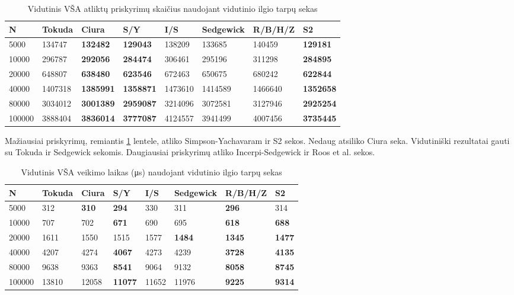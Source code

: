 \documentclass{VUMIFInfKursinis}
\begin{document}
\begin{table}[H]
  \caption{Vidutinis VŠA atliktų priskyrimų skaičius naudojant vidutinio ilgio tarpų sekas}
  \label{tss_medium_assignments}
  \begin{tabular}{|l|l|l|l|l|l|l|l|}
  \hline
  N      & Tokuda  & Ciura            & S/Y              & I/S     & Sedgewick & R/B/H/Z & S2               \\ \hline
  5000   & 134747  & \textbf{132482}  & \textbf{129043}  & 138209  & 133685    & 140459  & \textbf{129181}  \\ \hline
  10000  & 296787  & \textbf{292056}  & \textbf{284474}  & 306461  & 295196    & 311298  & \textbf{284895}  \\ \hline
  20000  & 648807  & \textbf{638480}  & \textbf{623546}  & 672463  & 650675    & 680242  & \textbf{622844}  \\ \hline
  40000  & 1407318 & \textbf{1385991} & \textbf{1358871} & 1473610 & 1414589   & 1466640 & \textbf{1352658} \\ \hline
  80000  & 3034012 & \textbf{3001389} & \textbf{2959087} & 3214096 & 3072581   & 3127946 & \textbf{2925254} \\ \hline
  100000 & 3888404 & \textbf{3836014} & \textbf{3777087} & 4124557 & 3941499   & 4007456 & \textbf{3735445} \\ \hline
  \end{tabular}
\end{table}

Mažiausiai priskyrimų, remiantis \ref{tss_medium_assignments} lentele, atliko Simpson-Yachavaram ir S2 sekos.
Nedaug atsiliko Ciura seka.
Vidutiniški rezultatai gauti su Tokuda ir Sedgewick sekomis.
Daugiausiai priskyrimų atliko Incerpi-Sedgewick ir Roos et al. sekos.

\begin{table}[H]
  \caption{Vidutinis VŠA veikimo laikas (μs) naudojant vidutinio ilgio tarpų sekas}
  \label{tss_medium_runtimes}
  \begin{tabular}{|l|l|l|l|l|l|l|l|}
  \hline
  N      & Tokuda & Ciura        & S/Y            & I/S   & Sedgewick     & R/B/H/Z       & S2            \\ \hline
  5000   & 312    & \textbf{310} & \textbf{294}   & 330   & 311           & \textbf{296}  & 314           \\ \hline
  10000  & 707    & 702          & \textbf{671}   & 690   & 695           & \textbf{618}  & \textbf{688}  \\ \hline
  20000  & 1611   & 1550         & 1515           & 1577  & \textbf{1484} & \textbf{1345} & \textbf{1477} \\ \hline
  40000  & 4207   & 4274         & \textbf{4067}  & 4273  & 4239          & \textbf{3728} & \textbf{4135} \\ \hline
  80000  & 9638   & 9363         & \textbf{8541}  & 9064  & 9132          & \textbf{8058} & \textbf{8745} \\ \hline
  100000 & 13810  & 12058        & \textbf{11077} & 11652 & 11976         & \textbf{9225} & \textbf{9314} \\ \hline
  \end{tabular}
\end{table}
\end{document}
